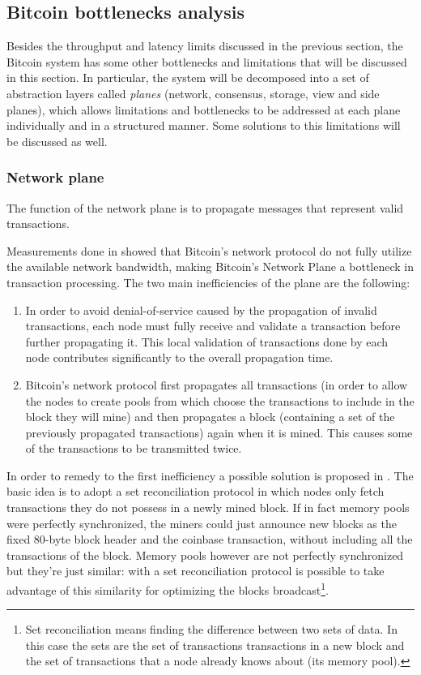 \subsection{Bitcoin bottlenecks analysis}  Besides the throughput and latency
limits discussed in the previous section, the Bitcoin system has some other
bottlenecks and limitations that will be  discussed in this section. In
particular, the system will be decomposed into a set of abstraction layers
called \emph{planes} (network, consensus, storage, view and side planes), which
allows limitations and bottlenecks to be addressed at each plane individually
and in a structured manner. Some solutions to this limitations will be discussed
as well.

\subsubsection{Network plane}
The function of the network plane is to propagate messages that represent
valid transactions.

Measurements done in \cite{croman-scaling-blockchain} showed that Bitcoin’s
network protocol do not fully utilize the available network bandwidth,
making Bitcoin’s Network Plane a bottleneck in transaction processing. The two
main inefficiencies of the plane are the following:
\begin{enumerate}
  \item In order to avoid denial-of-service caused by the propagation of invalid
  transactions, each node must fully receive and validate a transaction before
  further propagating it. This local validation of transactions done by each node
  contributes significantly to the overall propagation time.
  \item Bitcoin’s network protocol first propagates all transactions (in order
  to allow the nodes to create pools from which choose the transactions to include
  in the block they will mine) and then propagates a block (containing a set of
  the previously propagated transactions) again when it is mined. This causes
  some of the transactions to be transmitted twice.
\end{enumerate}

In order to remedy to the first inefficiency a possible solution is proposed in
\cite{andresen}. The basic idea is to adopt a set reconciliation protocol in
which nodes only fetch transactions they do not possess in a newly mined block.
If in fact memory pools were perfectly synchronized, the miners could just
announce new blocks as the fixed 80-byte block header and the coinbase
transaction, without including all the transactions of the block. Memory pools
however are not perfectly synchronized but they're just similar: with a set
reconciliation protocol is possible to take advantage of this similarity for
optimizing the blocks broadcast\footnote{Set reconciliation means finding the
difference between two sets of data. In this case the sets are the set of
transactions transactions in a new block and the set of transactions that a node
already knows about (its memory pool).}.


